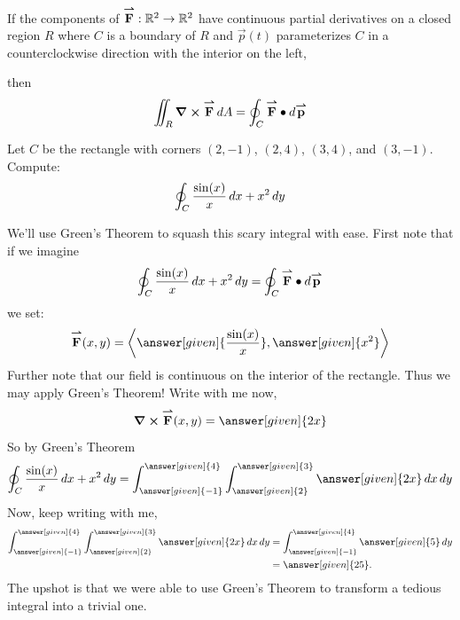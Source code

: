 \documentclass{ximera}
\begin{document}
\begin{theorem}
  If the components of ${\overset{\boldsymbol{\rightharpoonup}}{\mathbf{F}}}:\mathbb R^2\to\mathbb R^2$ have continuous partial
  derivatives on a closed region $R$ where $C$ is a boundary of $R$
  and $\vec{p}(t)$ parameterizes $C$ in a counterclockwise direction
  with the interior on the left,
  \begin{image}
  \end{image}
  then
  \[
  \iint_R \boldsymbol\nabla\boldsymbol\times{\overset{\boldsymbol{\rightharpoonup}}{\mathbf{F}}}\mathop{}\!d A = \oint_C {\overset{\boldsymbol{\rightharpoonup}}{\mathbf{F}}}\bullet\mathop{}\!d{\overset{\boldsymbol{\rightharpoonup}}{\mathbf{p}}} 
  \]
\end{theorem}

\begin{example}
  Let $C$ be the rectangle with corners $(2,-1)$, $(2,4)$, $(3,4)$, and $(3,-1)$. Compute:
  \[
  \oint_C \frac{\sin(x)}{x} \mathop{}\!d x + x^2 \mathop{}\!d y
  \]
  \begin{explanation}
    We'll use Green's Theorem to squash this scary integral with
    ease. First note that if we imagine
    \[
    \oint_C \frac{\sin(x)}{x} \mathop{}\!d x + x^2 \mathop{}\!d y = \oint_C{\overset{\boldsymbol{\rightharpoonup}}{\mathbf{F}}}\bullet\mathop{}\!d{\overset{\boldsymbol{\rightharpoonup}}{\mathbf{p}}}
    \]
    we set:
    \[
    \vec{F}(x,y) = \vector{\answer[given]{\frac{\sin(x)}{x}},\answer[given]{x^2}}
    \]
    Further note that our field is continuous on the interior of the
    rectangle. Thus we may apply Green's Theorem! Write with me now, 
    \[
    \curl \vec{F}(x,y) = \answer[given]{2x}
    \]
    So by Green's Theorem
    \[
    \oint_C \frac{\sin(x)}{x} \d x + x^2 \d y = \int_{\answer[given]{-1}}^{\answer[given]{4}}\int_{\answer[given]{2}}^{\answer[given]{3}} \answer[given]{2x}\d x\d y
    \]
    Now, keep writing with me,
    \begin{align*}
      \int_{\answer[given]{-1}}^{\answer[given]{4}}\int_{\answer[given]{2}}^{\answer[given]{3}} \answer[given]{2x}\d x\d y &= \int_{\answer[given]{-1}}^{\answer[given]{4}} \answer[given]{5} \d y\\
      &= \answer[given]{25}.
    \end{align*}
    The upshot is that we were able to use Green's Theorem to
    transform a tedious integral into a trivial one.
  \end{explanation}
\end{example}
\end{document}
